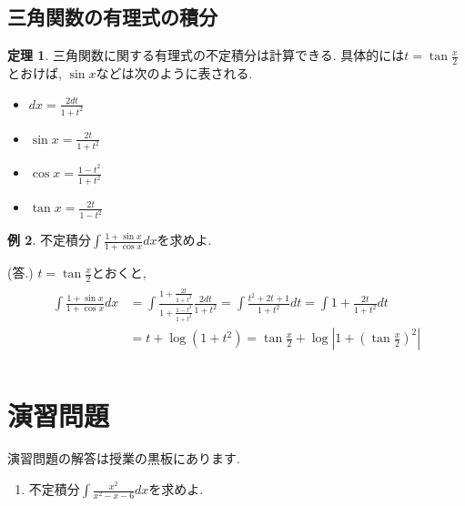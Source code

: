\documentclass[dvipdfmx,a4paper,11pt]{article}
\theoremstyle{definition}
\newtheorem{thm}{定理}
\newtheorem{exa}[thm]{例}
\begin{document}
\subsection{三角関数の有理式の積分}

\begin{tcolorbox}[
    colback = white,
    colframe = green!35!black,
    fonttitle = \bfseries,
    breakable = true]
    \begin{thm}
三角関数に関する有理式の不定積分は計算できる.
具体的には$t = \tan \frac{x}{2}$とおけば, $\sin x$などは次のように表される.
\begin{itemize}
\item $dx = \frac{2 dt}{1+ t^2}$
\item $\sin x = \frac{2t}{1+ t^2}$
\item $\cos x = \frac{1 - t^2}{1+ t^2}$
\item $\tan x = \frac{2t}{1- t^2}$
\end{itemize}


        \end{thm}
    \end{tcolorbox}
    
\begin{exa}
不定積分$\int \frac{1 + \sin x}{1 + \cos x} dx$を求めよ.

\hspace{-18pt}(答.) $t = \tan \frac{x}{2}$とおくと, 
\begin{align*}
\begin{split}
\int \frac{1 + \sin x}{1 + \cos x} dx
&= \int \frac{1 + \frac{2t}{1+t^2} }{ 1+ \frac{1-t^2}{1+ t^2}} 
\frac{2dt}{1+ t^2} = \int \frac{t^2 + 2t + 1}{1+ t^2} dt = \int 1 +\frac{2t}{1+ t^2} dt \\
&= t + \log (1 + t^2) = \tan \frac{x}{2} + \log \left|1 + \left(\tan \frac{x}{2} \right)^2 \right|\\
\end{split}
\end{align*}

\end{exa}


\section{演習問題}
演習問題の解答は授業の黒板にあります.
\begin{enumerate}
\item 不定積分$\int \frac{x^2}{x^2 - x - 6}dx$を求めよ.
\end{enumerate}



 
\end{document}
